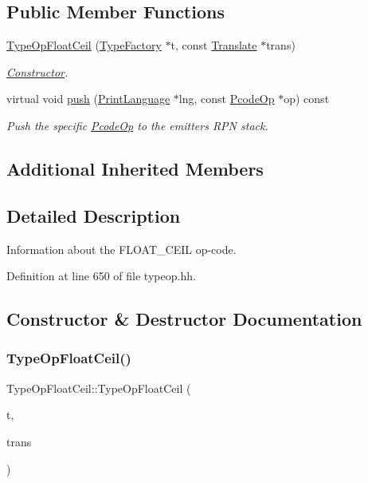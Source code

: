 \subsection*{Public Member Functions}
\begin{DoxyCompactItemize}
\item 
\mbox{\hyperlink{class_type_op_float_ceil_a19101ac539dbc2347060728582119c2a}{Type\+Op\+Float\+Ceil}} (\mbox{\hyperlink{class_type_factory}{Type\+Factory}} $\ast$t, const \mbox{\hyperlink{class_translate}{Translate}} $\ast$trans)
\begin{DoxyCompactList}\small\item\em \mbox{\hyperlink{class_constructor}{Constructor}}. \end{DoxyCompactList}\item 
virtual void \mbox{\hyperlink{class_type_op_float_ceil_a9cb750e543b0e588ec6d478d4e5f86aa}{push}} (\mbox{\hyperlink{class_print_language}{Print\+Language}} $\ast$lng, const \mbox{\hyperlink{class_pcode_op}{Pcode\+Op}} $\ast$op) const
\begin{DoxyCompactList}\small\item\em Push the specific \mbox{\hyperlink{class_pcode_op}{Pcode\+Op}} to the emitter\textquotesingle{}s R\+PN stack. \end{DoxyCompactList}\end{DoxyCompactItemize}
\subsection*{Additional Inherited Members}


\subsection{Detailed Description}
Information about the F\+L\+O\+A\+T\+\_\+\+C\+E\+IL op-\/code. 

Definition at line 650 of file typeop.\+hh.



\subsection{Constructor \& Destructor Documentation}
\mbox{\label{class_type_op_float_ceil_a19101ac539dbc2347060728582119c2a}} 
\subsubsection{\texorpdfstring{TypeOpFloatCeil()}{TypeOpFloatCeil()}}
{\footnotesize\ttfamily Type\+Op\+Float\+Ceil\+::\+Type\+Op\+Float\+Ceil (\begin{DoxyParamCaption}\item[{\mbox{\hyperlink{class_type_factory}{Type\+Factory}} $\ast$}]{t,  }\item[{const \mbox{\hyperlink{class_translate}{Translate}} $\ast$}]{trans }\end{DoxyParamCaption})}



